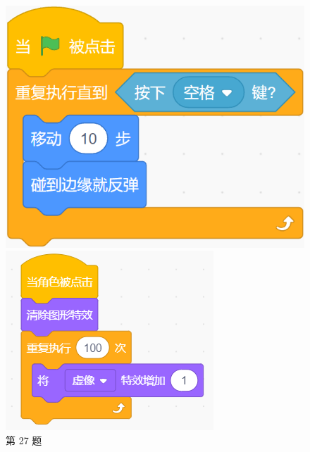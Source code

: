 \documentclass[10pt, a4paper]{article}
\begin{document}
\begin{enumerate}
        \begin{figure}[htbp]
            \centering
            \begin{minipage}[t]{.2\textwidth}
                \centering
                \includegraphics[width=\textwidth]{27.png}
                \caption*{第 27 题}
            \end{minipage}
            \begin{minipage}[t]{.19\textwidth}
                \centering
                \includegraphics[width=\textwidth]{28.png}

\end{minipage}
\end{figure}
\end{enumerate}
\end{document}

